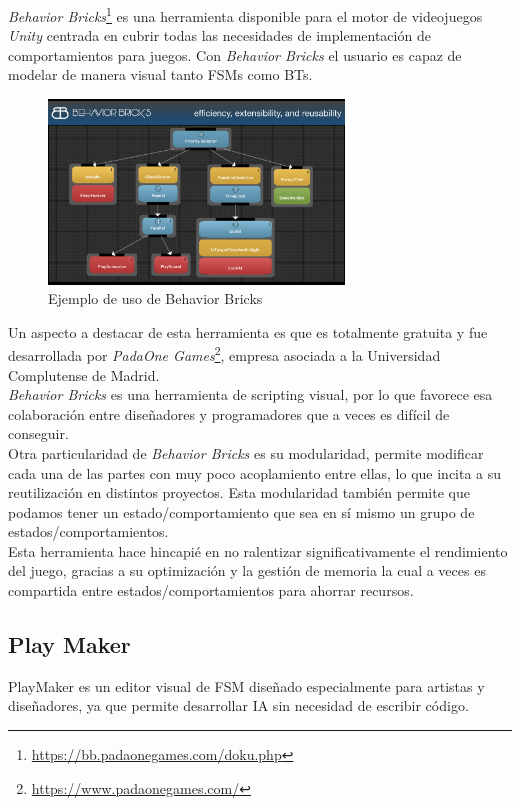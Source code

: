 \textit{Behavior Bricks}\footnote{\url{https://bb.padaonegames.com/doku.php}} es una herramienta disponible para el motor de videojuegos \textit{Unity} centrada en cubrir todas las necesidades de implementación de comportamientos para juegos. Con \textit{Behavior Bricks} el usuario es capaz de modelar de manera visual tanto FSMs como BTs.\\
\begin{figure}[h]
	\centering
	\includegraphics[width = 0.7\textwidth]{Imagenes/Behavior_Bricks.jpg}
	\caption{Ejemplo de uso de Behavior Bricks}
	\label{fig:BH_Figure}
\end{figure}
Un aspecto a destacar de esta herramienta es que es totalmente gratuita y fue desarrollada por \textit{PadaOne Games}\footnote{\url{https://www.padaonegames.com/}}, empresa asociada a la Universidad Complutense de Madrid.\\
\textit{Behavior Bricks} es una herramienta de scripting visual, por lo que favorece esa colaboración entre diseñadores y programadores que a veces es difícil de conseguir.\\
Otra particularidad de \textit{Behavior Bricks} es su modularidad, permite modificar cada una de las partes con muy poco acoplamiento entre ellas, lo que incita a su reutilización en distintos proyectos. Esta modularidad también permite que podamos tener un estado/comportamiento que sea en sí mismo un grupo de estados/comportamientos.\\
Esta herramienta hace hincapié en no ralentizar significativamente el rendimiento del juego, gracias a su optimización y la gestión de memoria la cual a veces es compartida entre estados/comportamientos para ahorrar recursos.\\

\subsection{Play Maker}
PlayMaker es un editor visual de FSM diseñado especialmente para artistas y diseñadores, ya que permite desarrollar IA sin necesidad de escribir código.


